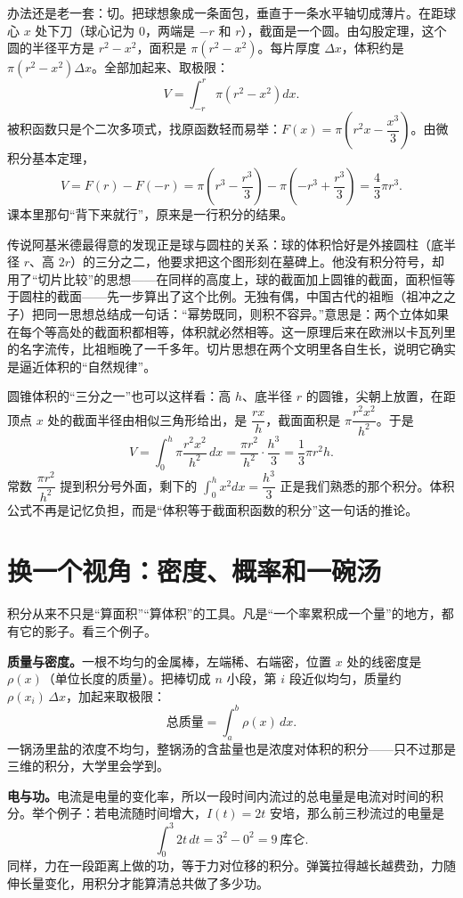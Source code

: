 办法还是老一套：切。把球想象成一条面包，垂直于一条水平轴切成薄片。在距球心 $x$ 处下刀（球心记为 $0$，两端是 $-r$ 和 $r$），截面是一个圆。由勾股定理，这个圆的半径平方是 $r^{2}-x^{2}$，面积是 $\pi\left(r^{2}-x^{2}\right)$。每片厚度 $\Delta x$，体积约是 $\pi\left(r^{2}-x^{2}\right)\Delta x$。全部加起来、取极限：
\[
V=\int_{-r}^{r}\pi\left(r^{2}-x^{2}\right)dx .
\]
被积函数只是个二次多项式，找原函数轻而易举：$F(x)=\pi\left(r^{2}x-\dfrac{x^{3}}{3}\right)$。由微积分基本定理，
\[
V=F(r)-F(-r)=\pi\left(r^{3}-\frac{r^{3}}{3}\right)-\pi\left(-r^{3}+\frac{r^{3}}{3}\right)=\frac{4}{3}\pi r^{3} .
\]
课本里那句“背下来就行”，原来是一行积分的结果。

传说阿基米德最得意的发现正是球与圆柱的关系：球的体积恰好是外接圆柱（底半径 $r$、高 $2r$）的三分之二，他要求把这个图形刻在墓碑上。他没有积分符号，却用了“切片比较”的思想——在同样的高度上，球的截面加上圆锥的截面，面积恒等于圆柱的截面——先一步算出了这个比例。无独有偶，中国古代的祖暅（祖冲之之子）把同一思想总结成一句话：“幂势既同，则积不容异。”意思是：两个立体如果在每个等高处的截面积都相等，体积就必然相等。这一原理后来在欧洲以卡瓦列里的名字流传，比祖暅晚了一千多年。切片思想在两个文明里各自生长，说明它确实是逼近体积的“自然规律”。

圆锥体积的“三分之一”也可以这样看：高 $h$、底半径 $r$ 的圆锥，尖朝上放置，在距顶点 $x$ 处的截面半径由相似三角形给出，是 $\dfrac{rx}{h}$，截面面积是 $\pi\dfrac{r^{2}x^{2}}{h^{2}}$。于是
\[
V=\int_0^{h}\pi\frac{r^{2}x^{2}}{h^{2}}\,dx=\frac{\pi r^{2}}{h^{2}}\cdot\frac{h^{3}}{3}=\frac13\pi r^{2}h .
\]
常数 $\dfrac{\pi r^{2}}{h^{2}}$ 提到积分号外面，剩下的 $\int_0^{h}x^{2}dx=\dfrac{h^{3}}{3}$ 正是我们熟悉的那个积分。体积公式不再是记忆负担，而是“体积等于截面积函数的积分”这一句话的推论。

\section{换一个视角：密度、概率和一碗汤}

积分从来不只是“算面积”“算体积”的工具。凡是“一个率累积成一个量”的地方，都有它的影子。看三个例子。

\textbf{质量与密度。}一根不均匀的金属棒，左端稀、右端密，位置 $x$ 处的线密度是 $\rho(x)$（单位长度的质量）。把棒切成 $n$ 小段，第 $i$ 段近似均匀，质量约 $\rho(x_i)\,\Delta x$，加起来取极限：
\[
\text{总质量}=\int_a^b \rho(x)\,dx .
\]
一锅汤里盐的浓度不均匀，整锅汤的含盐量也是浓度对体积的积分——只不过那是三维的积分，大学里会学到。

\textbf{电与功。}电流是电量的变化率，所以一段时间内流过的总电量是电流对时间的积分。举个例子：若电流随时间增大，$I(t)=2t$ 安培，那么前三秒流过的电量是
\[
\int_0^3 2t\,dt=3^{2}-0^{2}=9\ \text{库仑} .
\]
同样，力在一段距离上做的功，等于力对位移的积分。弹簧拉得越长越费劲，力随伸长量变化，用积分才能算清总共做了多少功。

